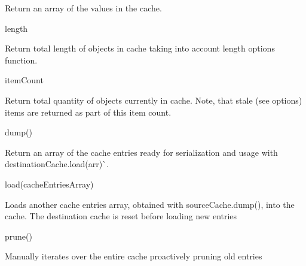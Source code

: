 \begin{DoxyItemize}
Return an array of the values in the cache.
\item {\ttfamily length}

Return total length of objects in cache taking into account {\ttfamily length} options function.
\item {\ttfamily item\+Count}

Return total quantity of objects currently in cache. Note, that {\ttfamily stale} (see options) items are returned as part of this item count.
\item {\ttfamily dump()}

Return an array of the cache entries ready for serialization and usage with \textquotesingle{}destination\+Cache.\+load(arr)\`{}.
\item {\ttfamily load(cache\+Entries\+Array)}

Loads another cache entries array, obtained with {\ttfamily source\+Cache.\+dump()}, into the cache. The destination cache is reset before loading new entries
\item {\ttfamily prune()}

Manually iterates over the entire cache proactively pruning old entries 
\end{DoxyItemize}
